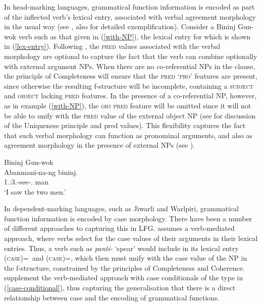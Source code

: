 \documentclass[output=paper,hidelinks]{langscibook}
\begin{document}
In head-marking languages, grammatical function information is encoded as part of the inflected verb's lexical entry, associated with verbal agreement morphology in the usual way (see , also \citealt[Chapter~4]{BoNoSa19} for detailed exemplification).  Consider a Bininj Gun-wok verb such as that given in (\ref{with-NP}), the lexical entry for which is shown in (\ref{lex-entry}). Following \citet{BM87}, the \textsc{pred} values associated with the verbal morphology are optional to capture the fact that the verb can combine optionally with external argument NPs. When there are no co-referential NPs in the clause, the principle of Completeness will ensure that the \textsc{pred} \textsc{`pro'} features are present, since otherwise the resulting f-structure will be incomplete, containing a \textsc{subject} and \textsc{object} lacking \textsc{pred} features. In the presence of a co-referential NP, however, as in example (\ref{with-NP}), the \textsc{obj} \textsc{pred} feature will be omitted since it will not be able to unify with the \textsc{pred} value of the external object NP (see  for discussion of the Uniqueness principle and {\sc pred} values). This flexibility captures the fact that such verbal morphology can function as pronominal arguments, and also as agreement morphology in the presence of external NPs (see ). 

\newpage
\ea \label{with-NP} Bininj Gun-wok\\
\gll Abanmani-na-ng bininj.\\
{1\SG.\SBJ:3\DU.\OBJ-see-\PST.\PFV} {man}\\
\glt `I saw the two men.' \citep[417]{Evans2003}
\z


\ea \label{lex-entry}
\z
 
In dependent-marking languages, such as Jiwarli and Warlpiri, grammatical function information is encoded by case morphology. There have been a number of different approaches to capturing this in LFG.  \citet{Simpson1983,Simpson1991} assumes a verb-mediated approach, where verbs select for the case values of their arguments in their lexical entries. Thus, a verb such as {\it panti-} `spear' would include in its lexical entry (\UP\SUBJ\textsc{case})=\ERG\ and (\UP\OBJ\textsc{case})=\ABS, which then must unify with the case value of the NP in the f-structure, constrained by the principles of Completeness and Coherence. \citet{NordBres2011} supplement the verb-mediated approach with case conditionals of the type in (\ref{case-conditional}), thus capturing the generalisation that there is a direct relationship between case and the encoding of grammatical functions.
\end{document}
